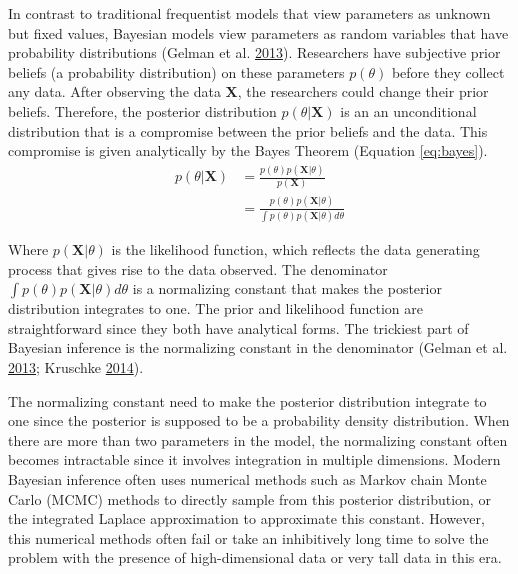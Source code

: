 \documentclass[12pt]{book}
\numberwithin{equation}{chapter}
\begin{document}
In contrast to traditional frequentist models that view parameters as unknown but fixed values, Bayesian models view parameters as random variables that have probability distributions (Gelman et al. \protect\hyperlink{ref-gelman2013bayesian}{2013}). Researchers have subjective prior beliefs (a probability distribution) on these parameters \(p(\theta)\) before they collect any data. After observing the data \(\mathbf{X}\), the researchers could change their prior beliefs. Therefore, the posterior distribution \(p(\theta | \mathbf{X})\) is an an unconditional distribution that is a compromise between the prior beliefs and the data. This compromise is given analytically by the Bayes Theorem (Equation \eqref{eq:bayes}).
\begin{equation}
\begin{split}
p(\theta | \mathbf{X}) & = \frac{p(\theta)p(\mathbf{X}|\theta)}{p(\mathbf{X})} \\
 & = \frac{p(\theta)p(\mathbf{X}|\theta )}{\int p(\theta)p(\mathbf{X}|\theta)d\theta}
\label{eq:bayes}
\end{split}
\end{equation}

Where \(p(\mathbf{X}|\theta)\) is the likelihood function, which reflects the data generating process that gives rise to the data observed. The denominator \(\int p(\theta)p(\mathbf{X}|\theta)d\theta\) is a normalizing constant that makes the posterior distribution integrates to one. The prior and likelihood function are straightforward since they both have analytical forms. The trickiest part of Bayesian inference is the normalizing constant in the denominator (Gelman et al. \protect\hyperlink{ref-gelman2013bayesian}{2013}; Kruschke \protect\hyperlink{ref-kruschke2014doing}{2014}).

The normalizing constant need to make the posterior distribution integrate to one since the posterior is supposed to be a probability density distribution. When there are more than two parameters in the model, the normalizing constant often becomes intractable since it involves integration in multiple dimensions. Modern Bayesian inference often uses numerical methods such as Markov chain Monte Carlo (MCMC) methods to directly sample from this posterior distribution, or the integrated Laplace approximation to approximate this constant. However, this numerical methods often fail or take an inhibitively long time to solve the problem with the presence of high-dimensional data or very tall data in this era.
\end{document}
